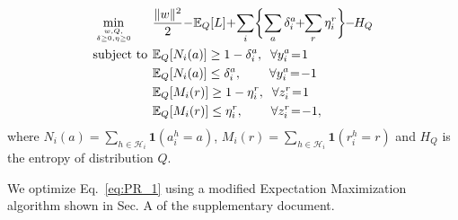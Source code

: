 \documentclass[10pt,twocolumn,letterpaper]{article}
\begin{document}
\vspace*{-7pt}
\begin{equation}\label{eq:PR_1}
\begin{aligned}
& \min \limits_{w,Q, \atop \delta \geq 0, \eta \geq 0} \hspace*{-19pt}
& \hspace*{-14pt} &  \frac{\|w \|^2}{2} \hspace*{-2pt} - \hspace*{-2pt} 
  \mathbb{E}_Q[L] \hspace*{-2pt} +  \hspace*{-2pt} \sum \limits_{i} \biggl\{\sum \limits_{a}  \delta_i^a \hspace*{-3pt} + 
  \hspace*{-3pt} \sum \limits_{r}  \eta_i^r  \biggr\} \hspace*{-3pt} - \hspace*{-3pt} H_{Q}\\
& \text{subject to} \hspace*{-6pt}
& & \mathbb{E}_Q [N_i(a)] \geq 1 - \delta_i^a, \;\; \forall y_i^a \hspace*{-2pt}=\hspace*{-2pt} 1 \\
&\hspace*{-3pt}&& \mathbb{E}_Q [N_i(a)] \leq \delta_i^a, \hspace*{22pt} \forall y_i^a \hspace*{-2pt}=\hspace*{-2pt} -1 \\
&\hspace*{-3pt}&& \mathbb{E}_Q [M_i(r)] \geq 1 - \eta_i^r, \;\; \forall z_i^r \hspace*{-2pt}=\hspace*{-2pt} 1 \\
&\hspace*{-3pt}&& \mathbb{E}_Q [M_i(r)] \leq \eta_i^r, \hspace*{22pt} \forall z_i^r \hspace*{-2pt}=\hspace*{-2pt} -1,
\end{aligned}
\end{equation} where $N_i(a) = \sum \limits_{h \in \mathcal{H}_i} \mathbf{1}(a_i^h=a)$, $M_i(r) = \sum \limits_{h \in \mathcal{H}_i} \mathbf{1}(r_i^h=r)$ 
and $H_Q$ is the entropy of distribution $Q$.

We optimize Eq.~\ref{eq:PR_1} using a modified Expectation Maximization
algorithm shown in Sec. A of the supplementary document.
\end{document}
